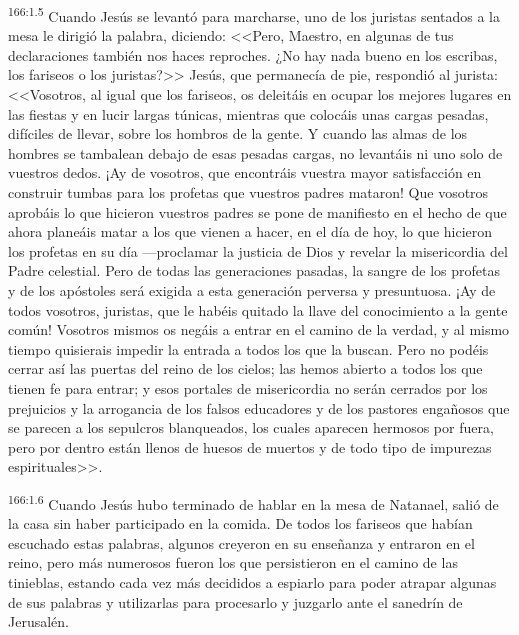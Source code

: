 \par 
\textsuperscript{166:1.5} Cuando Jesús se levantó para marcharse, uno de los juristas sentados a la mesa le dirigió la palabra, diciendo: <<Pero, Maestro, en algunas de tus declaraciones también nos haces reproches. ¿No hay nada bueno en los escribas, los fariseos o los juristas?>> Jesús, que permanecía de pie, respondió al jurista: <<Vosotros, al igual que los fariseos, os deleitáis en ocupar los mejores lugares en las fiestas y en lucir largas túnicas, mientras que colocáis unas cargas pesadas, difíciles de llevar, sobre los hombros de la gente. Y cuando las almas de los hombres se tambalean debajo de esas pesadas cargas, no levantáis ni uno solo de vuestros dedos. ¡Ay de vosotros, que encontráis vuestra mayor satisfacción en construir tumbas para los profetas que vuestros padres mataron! Que vosotros aprobáis lo que hicieron vuestros padres se pone de manifiesto en el hecho de que ahora planeáis matar a los que vienen a hacer, en el día de hoy, lo que hicieron los profetas en su día ---proclamar la justicia de Dios y revelar la misericordia del Padre celestial. Pero de todas las generaciones pasadas, la sangre de los profetas y de los apóstoles será exigida a esta generación perversa y presuntuosa. ¡Ay de todos vosotros, juristas, que le habéis quitado la llave del conocimiento a la gente común! Vosotros mismos os negáis a entrar en el camino de la verdad, y al mismo tiempo quisierais impedir la entrada a todos los que la buscan. Pero no podéis cerrar así las puertas del reino de los cielos; las hemos abierto a todos los que tienen fe para entrar; y esos portales de misericordia no serán cerrados por los prejuicios y la arrogancia de los falsos educadores y de los pastores engañosos que se parecen a los sepulcros blanqueados, los cuales aparecen hermosos por fuera, pero por dentro están llenos de huesos de muertos y de todo tipo de impurezas espirituales>>.

\par 
\textsuperscript{166:1.6} Cuando Jesús hubo terminado de hablar en la mesa de Natanael, salió de la casa sin haber participado en la comida. De todos los fariseos que habían escuchado estas palabras, algunos creyeron en su enseñanza y entraron en el reino, pero más numerosos fueron los que persistieron en el camino de las tinieblas, estando cada vez más decididos a espiarlo para poder atrapar algunas de sus palabras y utilizarlas para procesarlo y juzgarlo ante el sanedrín de Jerusalén.


